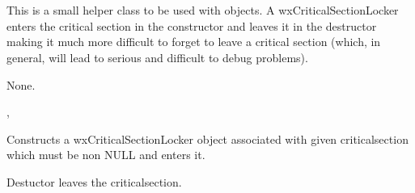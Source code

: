 \section{}\label{wxcriticalsectionlocker}

This is a small helper class to be used with  
objects. A wxCriticalSectionLocker enters the critical section in the
constructor and leaves it in the destructor making it much more difficult to
forget to leave a critical section (which, in general, will lead to serious
and difficult to debug problems).


None.


,


\label{wxcriticalsectionlockerctor}

Constructs a wxCriticalSectionLocker object associated with given
criticalsection which must be non NULL and enters it.

\label{wxcriticalsectionlockerdtor}

Destuctor leaves the criticalsection.
